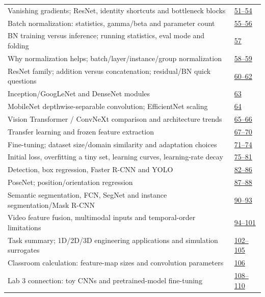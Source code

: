 \documentclass[10pt]{article}
\begin{document}
\begin{longtable}{@{}P{.79\linewidth}P{.17\linewidth}@{}}
Vanishing gradients; ResNet, identity shortcuts and bottleneck blocks & \href{../Lecture\%20Slides/4.1.\%20CNNs.pdf\#page=51}{51--54}\\[3pt]
Batch normalization: statistics, gamma/beta and parameter count & \href{../Lecture\%20Slides/4.1.\%20CNNs.pdf\#page=55}{55--56}\\[3pt]
BN training versus inference; running statistics, eval mode and folding & \href{../Lecture\%20Slides/4.1.\%20CNNs.pdf\#page=57}{57}\\[3pt]
Why normalization helps; batch/layer/instance/group normalization & \href{../Lecture\%20Slides/4.1.\%20CNNs.pdf\#page=58}{58--59}\\[3pt]
ResNet family; addition versus concatenation; residual/BN quick questions & \href{../Lecture\%20Slides/4.1.\%20CNNs.pdf\#page=60}{60--62}\\[3pt]
Inception/GoogLeNet and DenseNet modules & \href{../Lecture\%20Slides/4.1.\%20CNNs.pdf\#page=63}{63}\\[3pt]
MobileNet depthwise-separable convolution; EfficientNet scaling & \href{../Lecture\%20Slides/4.1.\%20CNNs.pdf\#page=64}{64}\\[3pt]
Vision Transformer / ConvNeXt comparison and architecture trends & \href{../Lecture\%20Slides/4.1.\%20CNNs.pdf\#page=65}{65--66}\\[3pt]
Transfer learning and frozen feature extraction & \href{../Lecture\%20Slides/4.1.\%20CNNs.pdf\#page=67}{67--70}\\[3pt]
Fine-tuning; dataset size/domain similarity and adaptation choices & \href{../Lecture\%20Slides/4.1.\%20CNNs.pdf\#page=71}{71--74}\\[3pt]
Initial loss, overfitting a tiny set, learning curves, learning-rate decay & \href{../Lecture\%20Slides/4.1.\%20CNNs.pdf\#page=75}{75--81}\\[3pt]
Detection, box regression, Faster R-CNN and YOLO & \href{../Lecture\%20Slides/4.1.\%20CNNs.pdf\#page=82}{82--86}\\[3pt]
PoseNet; position/orientation regression & \href{../Lecture\%20Slides/4.1.\%20CNNs.pdf\#page=87}{87--88}\\[3pt]
Semantic segmentation, FCN, SegNet and instance segmentation/Mask R-CNN & \href{../Lecture\%20Slides/4.1.\%20CNNs.pdf\#page=90}{90--93}\\[3pt]
Video feature fusion, multimodal inputs and temporal-order limitations & \href{../Lecture\%20Slides/4.1.\%20CNNs.pdf\#page=94}{94--101}\\[3pt]
Task summary; 1D/2D/3D engineering applications and simulation surrogates & \href{../Lecture\%20Slides/4.1.\%20CNNs.pdf\#page=102}{102--105}\\[3pt]
Classroom calculation: feature-map sizes and convolution parameters & \href{../Lecture\%20Slides/4.1.\%20CNNs.pdf\#page=106}{106}\\[3pt]
Lab 3 connection: toy CNNs and pretrained-model fine-tuning & \href{../Lecture\%20Slides/4.1.\%20CNNs.pdf\#page=108}{108--110}\\[3pt]
\bottomrule\end{longtable}
\end{document}
